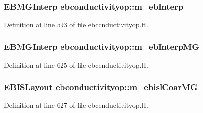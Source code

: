 \subsubsection[{\texorpdfstring{m\+\_\+eb\+Interp}{m_ebInterp}}]{\setlength{\rightskip}{0pt plus 5cm}E\+B\+M\+G\+Interp ebconductivityop\+::m\+\_\+eb\+Interp\hspace{0.3cm}{\ttfamily [protected]}}\hypertarget{classebconductivityop_ac7f2e44076a11912860b47052556845d}{}\label{classebconductivityop_ac7f2e44076a11912860b47052556845d}


Definition at line 593 of file ebconductivityop.\+H.

\subsubsection[{\texorpdfstring{m\+\_\+eb\+Interp\+MG}{m_ebInterpMG}}]{\setlength{\rightskip}{0pt plus 5cm}E\+B\+M\+G\+Interp ebconductivityop\+::m\+\_\+eb\+Interp\+MG\hspace{0.3cm}{\ttfamily [protected]}}\hypertarget{classebconductivityop_aaefb7a43ec6b21b2e90f942a02fb0f5b}{}\label{classebconductivityop_aaefb7a43ec6b21b2e90f942a02fb0f5b}


Definition at line 625 of file ebconductivityop.\+H.

\subsubsection[{\texorpdfstring{m\+\_\+ebisl\+Coar\+MG}{m_ebislCoarMG}}]{\setlength{\rightskip}{0pt plus 5cm}E\+B\+I\+S\+Layout ebconductivityop\+::m\+\_\+ebisl\+Coar\+MG\hspace{0.3cm}{\ttfamily [protected]}}\hypertarget{classebconductivityop_a1d5158f394a9f1c92cbabf9b7f16e0bb}{}\label{classebconductivityop_a1d5158f394a9f1c92cbabf9b7f16e0bb}


Definition at line 627 of file ebconductivityop.\+H.

